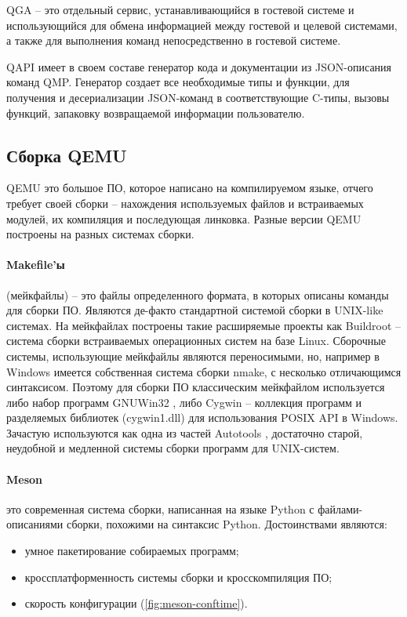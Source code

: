 QGA -- это отдельный сервис, устанавливающийся в гостевой системе и использующийся для обмена информацией
между гостевой и целевой системами, а также для выполнения команд непосредственно в гостевой системе.

QAPI имеет в своем составе генератор кода и документации из JSON-описания команд QMP.
Генератор создает все необходимые типы и функции, для получения и десериализации JSON-команд в соответствующие
C-типы, вызовы функций, запаковку возвращаемой информации пользователю.

\subsection{Сборка QEMU}\label{sec:ch1/sec4/sub3/sub7}

QEMU это большое ПО, которое написано на компилируемом языке, отчего требует
своей сборки -- нахождения используемых файлов и встраиваемых модулей,
их компиляция и последующая линковка. Разные версии QEMU построены на разных
системах сборки.

\paragraph{Makefile'ы} \cite{make} (мейкфайлы) -- это файлы определенного формата,
в которых описаны команды для сборки ПО.
Являются де-факто стандартной системой сборки в UNIX-like системах.
На мейкфайлах построены такие расширяемые проекты как Buildroot \cite{buildroot} --
система сборки встраиваемых операционных систем на базе Linux.
Сборочные системы, использующие мейкфайлы являются переносимыми, но, например в Windows
имеется собственная система сборки nmake, с несколько отличающимся синтаксисом.
Поэтому для сборки ПО классическим мейкфайлом используется либо набор программ GNUWin32 \cite{gnuwin32}, либо Cygwin \cite{cygwin} --
коллекция программ и разделяемых библиотек (cygwin1.dll) для использования POSIX API в Windows.
Зачастую используются как одна из частей Autotools \cite{autotools},
достаточно старой, неудобной и медленной системы сборки программ для UNIX-систем.

\paragraph{Meson} \cite{meson} это современная система сборки, написанная на языке Python с файлами-описаниями
сборки, похожими на синтаксис Python. Достоинствами являются:
\begin{itemize}
    \item умное пакетирование собираемых программ;
    \item кроссплатформенность системы сборки и кросскомпиляция ПО;
    \item скорость конфигурации (\cref{fig:meson-conftime}).
\end{itemize}


